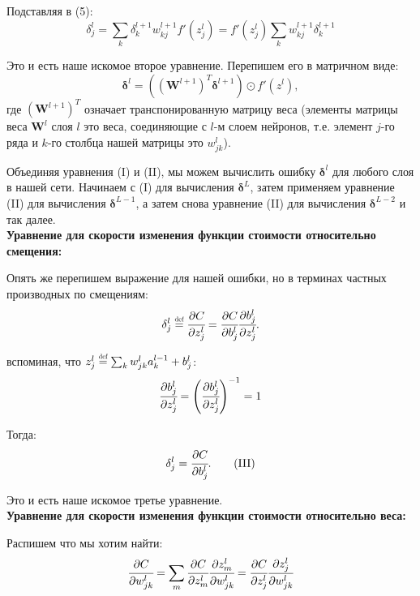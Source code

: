Подставляя в (5):
\begin{equation*}
    \delta_j^l = \sum_k \delta_k^{l+1} w_{kj}^{l+1} f'(z_j^l) = f'(z_j^l) \sum_k w_{kj}^{l+1} \delta_k^{l+1}
\end{equation*}

Это и есть наше искомое второе уравнение. Перепишем его в матричном виде:
\begin{equation*}
    \bm{\delta}^l = ((\bm{W}^{l+1})^T \bm{\delta}^{l+1}) \odot f'(z^l),
    \tag{II}
\end{equation*}
где $(\bm{W}^{l+1})^T$ означает транспонированную матрицу веса 
(элементы матрицы веса $\bm{W}^l$ слоя $l$ это веса, соединяющие с $l$-м слоем нейронов, 
т.е. элемент $j$-го ряда и $k$-го столбца нашей матрицы это $w_{jk}^l$).

Объединяя уравнения (I) и (II), мы можем вычислить ошибку $\bm{\delta}^l$ для любого 
слоя в нашей сети. Начинаем с (I) для вычисления $\bm{\delta}^L$, затем применяем 
уравнение (II) для вычисления $\bm{\delta}^{L-1}$, а затем снова уравнение (II) для 
вычисления $\bm{\delta}^{L-2}$ и так далее.\\

\noindent\textbf{Уравнение для скорости изменения функции стоимости относительно смещения:}

Опять же перепишем выражение для нашей ошибки, но в терминах частных производных 
по смещениям:
\begin{equation*}
    \delta_j^l \defeq \cfrac{\partial C}{\partial z_j^l} = 
    \cfrac{\partial C}{\partial b_j^l} \cfrac{\partial b_j^l}{\partial z_j^l}.
\end{equation*}

вспоминая, что $z_j^l \defeq \sum_k w_{jk}^l a_k^{l-1} + b_j^l$:
\begin{equation*}
    \cfrac{\partial b_j^l}{\partial z_j^l} = 
    \left( \cfrac{\partial b_j^l}{\partial z_j^l} \right)^{-1} = 1
\end{equation*}

Тогда:
\begin{equation*}
    \delta_j^l = \cfrac{\partial C}{\partial b_j^l}.
    \tag{III}
\end{equation*}

Это и есть наше искомое третье уравнение.\\

\noindent\textbf{Уравнение для скорости изменения функции стоимости относительно веса:}

Распишем что мы хотим найти:
\begin{equation}
    \cfrac{\partial C}{\partial w_{jk}^l} = \sum_m \cfrac{\partial C}{\partial z_m^l} \cfrac{\partial z_m^l}{\partial w_{jk}^l} = \cfrac{\partial C}{\partial z_j^l} \cfrac{\partial z_j^l}{\partial w_{jk}^l}
\end{equation}

